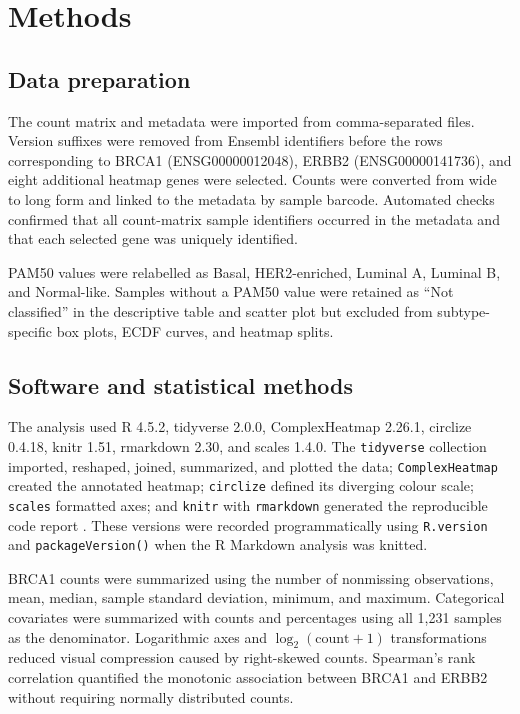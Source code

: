 \documentclass[11pt]{article}
\begin{document}
\section{Methods}

\subsection{Data preparation}

The count matrix and metadata were imported from comma-separated files. Version suffixes were removed from Ensembl identifiers before the rows corresponding to BRCA1 (ENSG00000012048), ERBB2 (ENSG00000141736), and eight additional heatmap genes were selected. Counts were converted from wide to long form and linked to the metadata by sample barcode. Automated checks confirmed that all count-matrix sample identifiers occurred in the metadata and that each selected gene was uniquely identified.

PAM50 values were relabelled as Basal, HER2-enriched, Luminal A, Luminal B, and Normal-like. Samples without a PAM50 value were retained as ``Not classified'' in the descriptive table and scatter plot but excluded from subtype-specific box plots, ECDF curves, and heatmap splits.

\subsection{Software and statistical methods}

The analysis used R 4.5.2, tidyverse 2.0.0, ComplexHeatmap 2.26.1, circlize 0.4.18, knitr 1.51, rmarkdown 2.30, and scales 1.4.0. The \texttt{tidyverse} collection imported, reshaped, joined, summarized, and plotted the data; \texttt{ComplexHeatmap} created the annotated heatmap; \texttt{circlize} defined its diverging colour scale; \texttt{scales} formatted axes; and \texttt{knitr} with \texttt{rmarkdown} generated the reproducible code report \cite{wickham2016,gu2016}. These versions were recorded programmatically using \texttt{R.version} and \texttt{packageVersion()} when the R Markdown analysis was knitted.

BRCA1 counts were summarized using the number of nonmissing observations, mean, median, sample standard deviation, minimum, and maximum. Categorical covariates were summarized with counts and percentages using all 1,231 samples as the denominator. Logarithmic axes and $\log_2(\mathrm{count}+1)$ transformations reduced visual compression caused by right-skewed counts. Spearman's rank correlation quantified the monotonic association between BRCA1 and ERBB2 without requiring normally distributed counts.
\end{document}
